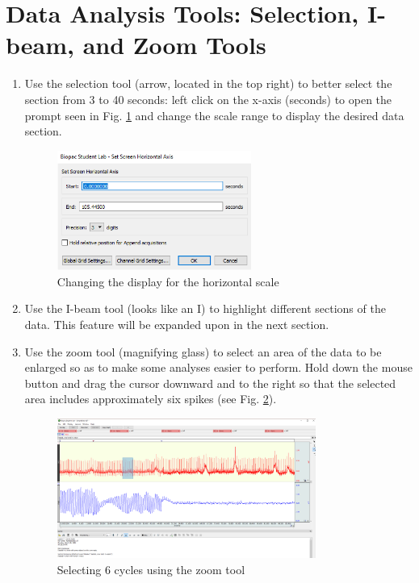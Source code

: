 \documentclass{article}
\begin{document}
\section*{Data Analysis Tools: Selection, I-beam, and Zoom Tools}
\begin{enumerate}
	\item Use the selection tool (arrow, located in the top right) to better select the section from 3 to 40 seconds: left click on the x-axis (seconds) to open the prompt seen in Fig. \ref{change_horiz} and change the scale range to display the desired data section.
	
		\begin{figure}[h]
		\includegraphics[width=0.6\textwidth]{../images/BIOPAC_19.png}
		\centering
		\caption{Changing the display for the horizontal scale}
		\label{change_horiz}
		\end{figure}
		
	\item Use the I-beam tool (looks like an I) to highlight different sections of the data. This feature will be expanded upon in the next section.
	\item Use the zoom tool (magnifying glass) to select an area of the data to be enlarged so as to make some analyses easier to perform. Hold down the mouse button and drag the cursor downward and to the right so that the selected area includes approximately six spikes (see Fig. \ref{select_cycles}).
	
		\begin{figure}[h]
		\includegraphics[width=0.8\textwidth]{../images/BIOPAC_22.png}
		\centering
		\caption{Selecting 6 cycles using the zoom tool}
		\label{select_cycles}
		\end{figure}
		

\end{enumerate}
\end{document}
